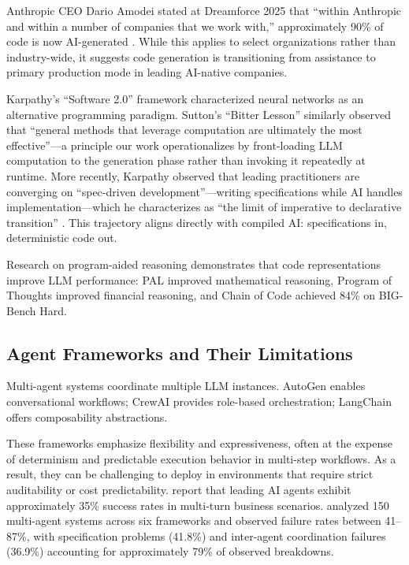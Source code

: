 \documentclass[11pt]{article}
\begin{document}
Anthropic CEO Dario Amodei stated at Dreamforce 2025 that ``within Anthropic and within a number of companies that we work with,'' approximately 90\% of code is now AI-generated \citep{amodei2025dreamforce}. While this applies to select organizations rather than industry-wide, it suggests code generation is transitioning from assistance to primary production mode in leading AI-native companies.

Karpathy's ``Software 2.0'' framework \citep{karpathy2017software2} characterized neural networks as an alternative programming paradigm. Sutton's ``Bitter Lesson'' \citep{sutton2019bitter} similarly observed that ``general methods that leverage computation are ultimately the most effective''---a principle our work operationalizes by front-loading LLM computation to the generation phase rather than invoking it repeatedly at runtime. More recently, Karpathy observed that leading practitioners are converging on ``spec-driven development''---writing specifications while AI handles implementation---which he characterizes as ``the limit of imperative to declarative transition'' \citep{karpathy2026specdriven}. This trajectory aligns directly with compiled AI: specifications in, deterministic code out.

Research on program-aided reasoning demonstrates that code representations improve LLM performance: PAL \citep{gao2023pal} improved mathematical reasoning, Program of Thoughts \citep{chen2023pot} improved financial reasoning, and Chain of Code \citep{li2024chainofcode} achieved 84\% on BIG-Bench Hard.

\subsection{Agent Frameworks and Their Limitations}

Multi-agent systems coordinate multiple LLM instances. AutoGen \citep{autogen2024} enables conversational workflows; CrewAI \citep{crewai2024} provides role-based orchestration; LangChain \citep{langchain2022} offers composability abstractions.

These frameworks emphasize flexibility and expressiveness, often at the expense of determinism and predictable execution behavior in multi-step workflows. As a result, they can be challenging to deploy in environments that require strict auditability or cost predictability. \citet{salesforce2025agents} report that leading AI agents exhibit approximately 35\% success rates in multi-turn business scenarios. \citet{cemri2025multiagent} analyzed 150 multi-agent systems across six frameworks and observed failure rates between 41--87\%, with specification problems (41.8\%) and inter-agent coordination failures (36.9\%) accounting for approximately 79\% of observed breakdowns.
\end{document}
